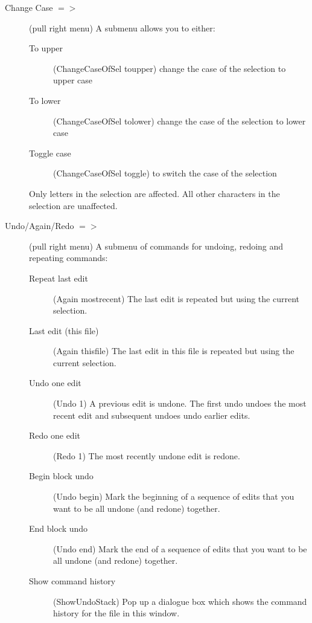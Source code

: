 \begin{description}
\begin{description}
	\item[Change Case $=>$] (pull right menu)
	A submenu allows you to either:
	\begin{description}

		\item[To upper] (ChangeCaseOfSel toupper) change the case
			of the selection to upper case

		\item[To lower] (ChangeCaseOfSel tolower) change the case
			of the selection to lower case

		\item[Toggle case] (ChangeCaseOfSel toggle) to switch the
			case of the selection

	\end{description}
	Only letters in the selection are affected.
	All other characters in the selection are unaffected.

	\item[Undo/Again/Redo $=>$] (pull right menu)
	A submenu of commands for undoing, redoing and repeating commands:
	\begin{description}
		\item[Repeat last edit] (Again mostrecent)
		The last edit is repeated but using the current selection.

		\item[Last edit (this file)] (Again thisfile)
		The last edit in this file is repeated
		but using the current selection.

		\item[Undo one edit] (Undo 1)
		A previous edit is undone.
		The first undo undoes the most recent edit and subsequent
		undoes undo earlier edits.

		\item[Redo one edit] (Redo 1)
		The most recently undone edit is redone.

		\item[Begin block undo] (Undo begin)
		Mark the beginning of a sequence of edits that you want to
		be all undone (and redone) together.

		\item[End block undo] (Undo end)
		Mark the end of a sequence of edits that you want to
		be all undone (and redone) together.

		\item[Show command history] (ShowUndoStack)
		Pop up a dialogue box which shows the command history for
		the file in this window.
	\end{description}


\end{description}
\end{description}
